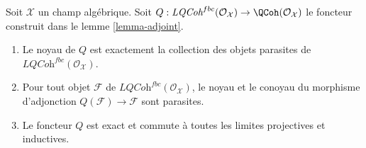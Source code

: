\begin{lemma}
\label{lemma-adjoint-kernel-parasitic}
Soit $\mathcal{X}$ un champ algébrique.
Soit $Q : \textit{LQCoh}^{fbc}(\mathcal{O}_\mathcal{X}) \to
\QCoh(\mathcal{O}_\mathcal{X})$
le foncteur construit dans le lemme \ref{lemma-adjoint}.
\begin{enumerate}
\item Le noyau de $Q$ est exactement la collection des objets parasites
de $\textit{LQCoh}^{fbc}(\mathcal{O}_\mathcal{X})$.
\item Pour tout objet $\mathcal{F}$
de $\textit{LQCoh}^{fbc}(\mathcal{O}_\mathcal{X})$, le noyau et le
conoyau du
morphisme d'adjonction $Q(\mathcal{F}) \to \mathcal{F}$ sont parasites.
\item Le foncteur $Q$ est exact et commute à toutes les limites projectives et inductives.
\end{enumerate}
\end{lemma}


